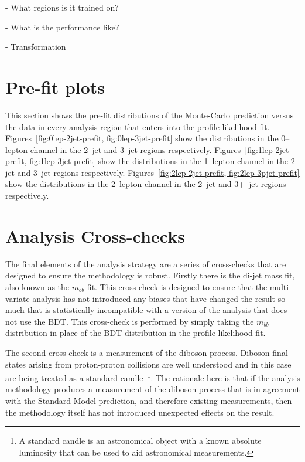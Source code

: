 - What regions is it trained on?

- What is the performance like?

- Transformation

\section{Pre-fit plots}
\label{sec:prefit}

This section shows the pre-fit distributions of the Monte-Carlo prediction
versus the data in every analysis region that enters into the profile-likelihood
fit. Figures~\ref{fig:0lep-2jet-prefit, fig:0lep-3jet-prefit} show the
distributions in the 0--lepton channel in the 2--jet and 3--jet regions
respectively. Figures~\ref{fig:1lep-2jet-prefit, fig:1lep-3jet-prefit} show the
distributions in the 1--lepton channel in the 2--jet and 3--jet regions
respectively. Figures~\ref{fig:2lep-2jet-prefit, fig:2lep-3pjet-prefit} show the
distributions in the 2--lepton channel in the 2--jet and 3+--jet regions
respectively.







\section{Analysis Cross-checks}

The final elements of the analysis strategy are a series of cross-checks that
are designed to ensure the methodology is robust. Firstly there is the di-jet
mass fit, also known as the $m_{bb}$ fit. This cross-check is designed to ensure
that the multi-variate analysis has not introduced any biases that have changed
the result so much that is statistically incompatible with a version of the
analysis that does not use the BDT. This cross-check is performed by simply
taking the $m_{bb}$ distribution in place of the BDT distribution in the
profile-likelihood fit.

The second cross-check is a measurement of the diboson process. Diboson final
states arising from proton-proton collisions are well understood and in this
case are being treated as a standard candle~\footnote{A standard candle is an
  astronomical object with a known absolute luminosity that can be used to aid
  astronomical measurements. }. The rationale here is that if the analysis
methodology produces a measurement of the diboson process that is in agreement
with the Standard Model prediction, and therefore existing measurements, then
the methodology itself has not introduced unexpected effects on the result.





